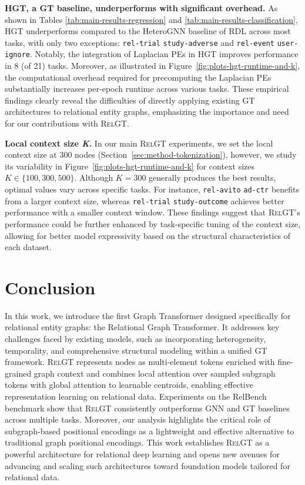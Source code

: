 \documentclass{article} %
\newcommand{\RelGT}{\textsc{RelGT}\xspace}
\begin{document}
\textbf{HGT, a GT baseline, underperforms with significant 
overhead.} As shown in Tables \ref{tab:main-results-regression} and \ref{tab:main-results-classification}, HGT \citep{hu2020heterogeneous} underperforms compared to the HeteroGNN baseline of RDL \citep{robinson2025relbench} across most tasks, with only two exceptions: \texttt{rel-trial} \texttt{study-adverse} and \texttt{rel-event} \texttt{user-ignore}. Notably, the integration of Laplacian PEs in HGT improves performance in 8 (of 21) tasks. Moreover, as illustrated in Figure~\ref{fig:plots-hgt-runtime-and-k}, the computational overhead required for precomputing the Laplacian PEs substantially increases per-epoch runtime across various tasks. 
These empirical findings clearly reveal the difficulties of directly applying existing GT architectures to relational entity graphs, emphasizing the importance and need for our contributions with \RelGT.


\textbf{Local context size \textit{K}.} In our main \RelGT experiments, we set the local context size at $300$ nodes (Section~\ref{sec:method-tokenization}), however, we study its variability in Figure~\ref{fig:plots-hgt-runtime-and-k} for context sizes $K \in \{100,300,500\}$. Although $K=300$ generally produces the best results, optimal values vary across specific tasks. For instance, \texttt{rel-avito} \texttt{ad-ctr} benefits from a larger context size, whereas \texttt{rel-trial} \texttt{study-outcome} achieves better performance with a smaller context window. These findings suggest that \RelGT's performance could be further enhanced by task-specific tuning of the context size, allowing for better model expressivity based on the structural characteristics of each dataset.

\section{Conclusion}
In this work, we introduce the first Graph Transformer designed specifically for relational entity graphs: the Relational Graph Transformer. It addresses key challenges faced by existing models, such as incorporating heterogeneity, temporality, and comprehensive structural modeling within a unified GT framework. \RelGT represents nodes as multi-element tokens enriched with fine-grained graph context and combines local attention over sampled subgraph tokens with global attention to learnable centroids, enabling effective representation learning on relational data. Experiments on the RelBench benchmark show that \RelGT consistently outperforms GNN and GT baselines across multiple tasks. Moreover, our analysis highlights the critical role of subgraph-based positional encodings as a lightweight and effective alternative to traditional graph positional encodings. This work establishes \RelGT as a powerful architecture for relational deep learning and opens new avenues for advancing and scaling such architectures toward foundation models tailored for relational data.
\end{document}
